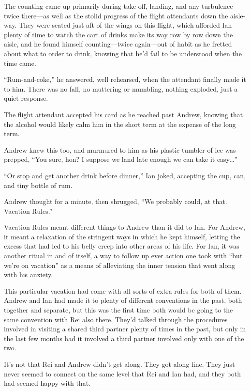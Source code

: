 The counting came up primarily during take-off, landing, and any turbulence---twice there---as well as the stolid progress of the flight attendants down the aisle-way. They were seated just aft of the wings on this flight, which afforded Ian plenty of time to watch the cart of drinks make its way row by row down the aisle, and he found himself counting---twice again---out of habit as he fretted about what to order to drink, knowing that he'd fail to be understood when the time came.

``Rum-and-coke,'' he answered, well rehearsed, when the attendant finally made it to him. There was no fall, no muttering or mumbling, nothing exploded, just a quiet response.

The flight attendant accepted his card as he reached past Andrew, knowing that the alcohol would likely calm him in the short term at the expense of the long term.

Andrew knew this too, and murmured to him as his plastic tumbler of ice was prepped, ``You sure, hon? I suppose we land late enough we can take it easy\ldots{}''

``Or stop and get another drink before dinner,'' Ian joked, accepting the cup, can, and tiny bottle of rum.

Andrew thought for a minute, then shrugged, ``We probably could, at that. Vacation Rules.''

Vacation Rules meant different things to Andrew than it did to Ian. For Andrew, it meant a relaxation of the stringent ways in which he kept himself, letting the excess that had led to his belly creep into other areas of his life. For Ian, it was another ritual in and of itself, a way to follow up ever action one took with ``but we're on vacation'' as a means of alleviating the inner tension that went along with his anxiety.

This particular vacation had come with all sorts of extra rules for both of them. Andrew and Ian had made it to plenty of different conventions in the past, both together and separate, but this was the first time both would be going to the same convention with Rei also there. They'd talked through the procedures involved in visiting a shared third partner plenty of times in the past, but only in the last few months had it involved a third partner involved only with one of the two.

It's not that Rei and Andrew didn't get along. They got along fine. They just never seemed to connect on the same level that Rei and Ian had, and they both had seemed happy with that.

